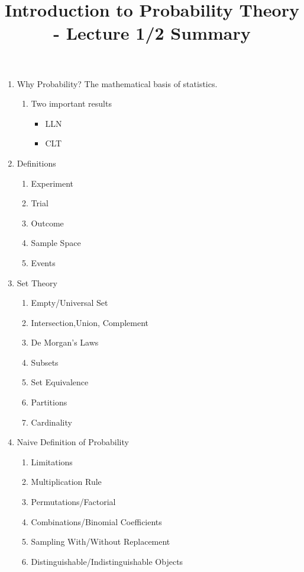 \documentclass[12pt]{article} %
\title{Introduction to Probability Theory - Lecture 1/2 Summary}
\date{}
\begin{document}
\maketitle
\begin{enumerate}
\item Why Probability? The mathematical basis of statistics.
\begin{enumerate}
\item Two important results
\begin{itemize}
\item LLN
\item CLT
\end{itemize}
\end{enumerate}
\item Definitions
\begin{enumerate}
\item Experiment
\item Trial
\item Outcome
\item Sample Space
\item Events
\end{enumerate}
\item Set Theory
\begin{enumerate}
\item Empty/Universal Set
\item Intersection,Union, Complement
\item De Morgan's Laws
\item Subsets
\item Set Equivalence
\item Partitions
\item Cardinality
\end{enumerate}
\item Naive Definition of Probability
\begin{enumerate}
\item Limitations
\item Multiplication Rule
\item Permutations/Factorial
\item Combinations/Binomial Coefficients
\item Sampling With/Without Replacement
\item Distinguishable/Indistinguishable Objects
\end{enumerate}
\end{enumerate}
\end{document}

